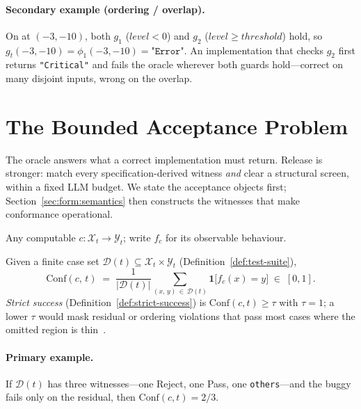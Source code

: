 \paragraph{Secondary example (ordering / overlap).}
On  at $(-3,-10)$, both $g_1$ ($\mathit{level}<0$) and
$g_2$ ($\mathit{level}\ge\mathit{threshold}$) hold, so
$g_t(-3,-10)=\phi_1(-3,-10)=\texttt{"Error"}$.
An implementation that checks $g_2$ first returns \texttt{"Critical"} and
fails the oracle wherever both guards hold---correct on many disjoint inputs,
wrong on the overlap.

\section{The Bounded Acceptance Problem}
\label{sec:form:acceptance}

The oracle answers what a correct implementation must return.
Release is stronger: match every specification-derived witness \emph{and} clear
a structural screen, within a fixed LLM budget.
We state the acceptance objects first; Section~\ref{sec:form:semantics}
then constructs the witnesses that make conformance operational.

\begin{definition}
\label{def:candidate}
Any computable $c : \mathcal{X}_t \to \mathcal{Y}_t$; write $f_c$ for its
observable behaviour.
\end{definition}

\begin{definition}
\label{def:conformance}
Given a finite case set $\mathcal{D}(t)\subseteq\mathcal{X}_t\times\mathcal{Y}_t$
(Definition~\ref{def:test-suite}),
\[
  \mathrm{Conf}(c,\,t)
  \;=\;
  \frac{1}{|\mathcal{D}(t)|}
  \sum_{(x,\,y)\,\in\,\mathcal{D}(t)}
  \mathbf{1}\bigl[f_c(x) = y\bigr]
  \;\in\; [0,1].
\]
\emph{Strict success} (Definition~\ref{def:strict-success}) is
$\mathrm{Conf}(c,t)\ge\tau$ with $\tau=1$; a lower $\tau$ would mask residual
or ordering violations that pass most cases where the omitted region is
thin~\citep{zhu1997specification}.
\end{definition}

\paragraph{Primary example.}
If $\mathcal{D}(t)$ has three witnesses---one Reject, one Pass, one
\texttt{others}---and the buggy  fails only on the
residual, then $\mathrm{Conf}(c,t)=2/3$.


